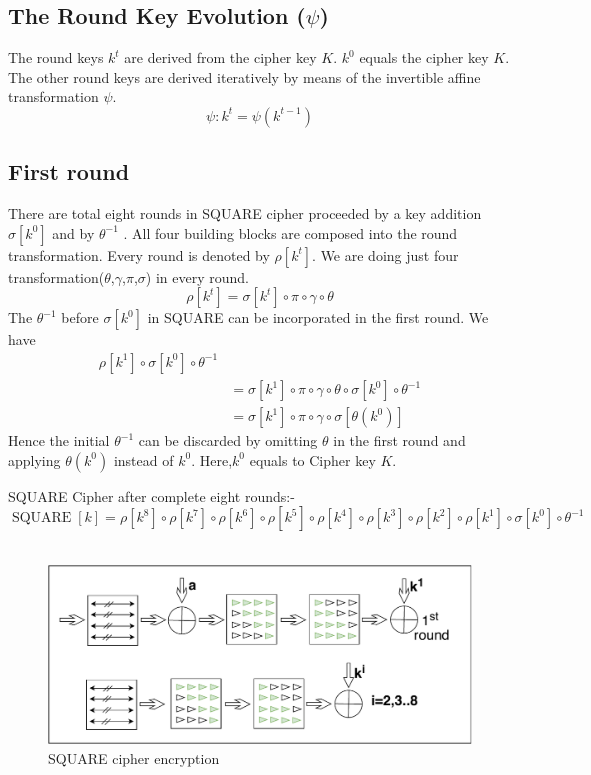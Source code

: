 \documentclass[preprint]{transcrypto}
\begin{document}
\subsection{The Round Key Evolution ($\psi$)}
The round keys $k^{t}$ are derived from the cipher key $K$. $k^{0}$ equals the cipher key $K$. The other round keys are derived iteratively by means of the invertible affine transformation $\psi$.
$$
  \psi: k^{t}=\psi\left(k^{t-1}\right)
$$

\subsection{First round}
There are total eight rounds in SQUARE cipher proceeded by a key addition $\sigma\left[k^{0}\right]$ and by $\theta^{-1}$ .
All four building blocks are composed into the round transformation. Every round is denoted by $\rho\left[k^{t}\right]$. We are doing just four transformation($\theta$,$\gamma$,$\pi$,$\sigma$) in every round.
$$
  \rho\left[k^{t}\right]=\sigma\left[k^{t}\right] \circ \pi \circ \gamma \circ \theta
$$
The $\theta^{-1}$ before $\sigma\left[k^{0}\right]$ in SQUARE can be incorporated in the first round. We have
$$
  \begin{aligned}
    \rho\left[k^{1}\right] \circ \sigma\left[k^{0}\right] \circ \theta^{-1}                               \\ &=\sigma\left[k^{1}\right] \circ \pi \circ \gamma \circ \theta \circ \sigma\left[k^{0}\right] \circ \theta^{-1} \\
     & =\sigma\left[k^{1}\right] \circ \pi \circ \gamma \circ \sigma\left[\theta\left(k^{0}\right)\right]
  \end{aligned}
$$
Hence the initial $\theta^{-1}$ can be discarded by omitting $\theta$ in the first round and applying $\theta\left(k^{0}\right)$ instead of $k^{0} .$
Here,$k^{0}$ equals to Cipher key $K$.

SQUARE Cipher after complete eight rounds:-\\
$$
  \operatorname{SQUARE}[k]=\rho\left[k^{8}\right] \circ \rho\left[k^{7}\right] \circ \rho\left[k^{6}\right] \circ \rho\left[k^{5}\right] \circ \rho\left[k^{4}\right] \circ \rho\left[k^{3}\right] \circ \rho\left[k^{2}\right] \circ \rho\left[k^{1}\right] \circ \sigma\left[k^{0}\right] \circ \theta^{-1}
$$
\\

\begin{figure}
  \centering
  \includegraphics[width=\linewidth]{Square_cipher_diagram}
  \caption{SQUARE cipher encryption}
\end{figure}
\end{document}
